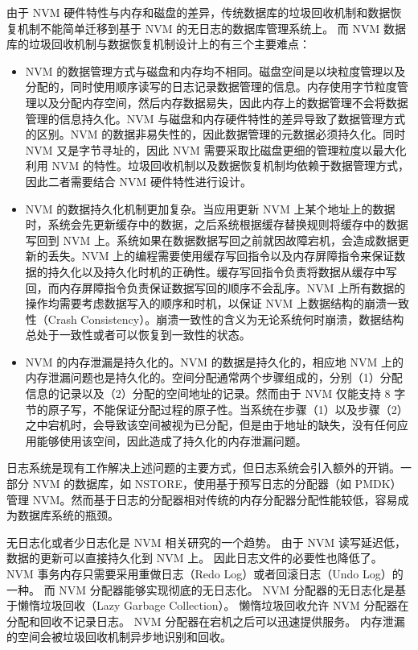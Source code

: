 由于 NVM 硬件特性与内存和磁盘的差异，传统数据库的垃圾回收机制和数据恢复机制不能简单迁移到基于 NVM 的无日志的数据库管理系统上。
而 NVM 数据库的垃圾回收机制与数据恢复机制设计上的有三个主要难点：
\begin{itemize}
    \item NVM 的数据管理方式与磁盘和内存均不相同。磁盘空间是以块粒度管理以及分配的，同时使用顺序读写的日志记录数据管理的信息。内存使用字节粒度管理以及分配内存空间，然后内存数据易失，因此内存上的数据管理不会将数据管理的信息持久化。NVM 与磁盘和内存硬件特性的差异导致了数据管理方式的区别。NVM 的数据非易失性的，因此数据管理的元数据必须持久化。同时 NVM 又是字节寻址的，因此 NVM 需要采取比磁盘更细的管理粒度以最大化利用 NVM 的特性。垃圾回收机制以及数据恢复机制均依赖于数据管理方式，因此二者需要结合 NVM 硬件特性进行设计。
    \item NVM 的数据持久化机制更加复杂。当应用更新 NVM 上某个地址上的数据时，系统会先更新缓存中的数据，之后系统根据缓存替换规则将缓存中的数据写回到 NVM 上。系统如果在数据数据写回之前就因故障宕机，会造成数据更新的丢失。NVM 上的编程需要使用缓存写回指令以及内存屏障指令来保证数据的持久化以及持久化时机的正确性。缓存写回指令负责将数据从缓存中写回，而内存屏障指令负责保证数据写回的顺序不会乱序。NVM 上所有数据的操作均需要考虑数据写入的顺序和时机，以保证 NVM 上数据结构的崩溃一致性（Crash Consistency）。崩溃一致性的含义为无论系统何时崩溃，数据结构总处于一致性或者可以恢复到一致性的状态。
    \item NVM 的内存泄漏是持久化的。NVM 的数据是持久化的，相应地 NVM 上的内存泄漏问题也是持久化的。空间分配通常两个步骤组成的，分别（1）分配信息的记录以及（2）分配的空间地址的记录。然而由于 NVM 仅能支持 8 字节的原子写，不能保证分配过程的原子性。当系统在步骤（1）以及步骤（2）之中宕机时，会导致该空间被视为已分配，但是由于地址的缺失，没有任何应用能够使用该空间，因此造成了持久化的内存泄漏问题。

\end{itemize}

日志系统是现有工作解决上述问题的主要方式，但日志系统会引入额外的开销。一部分 NVM 的数据库，如 NSTORE，使用基于预写日志的分配器（如 PMDK\cite{pmdk}）管理 NVM。然而基于日志的分配器相对传统的内存分配器分配性能较低，容易成为数据库系统的瓶颈。

无日志化或者少日志化是 NVM 相关研究的一个趋势。
由于 NVM 读写延迟低，数据的更新可以直接持久化到 NVM 上。
因此日志文件的必要性也降低了。
NVM 事务内存只需要采用重做日志（Redo Log）或者回滚日志（Undo Log）的一种。
而 NVM 分配器能够实现彻底的无日志化。
NVM 分配器的无日志化是基于懒惰垃圾回收（Lazy Garbage Collection）\cite{bhandari_makalu_2016}。
懒惰垃圾回收允许 NVM 分配器在分配和回收不记录日志。
NVM 分配器在宕机之后可以迅速提供服务。
内存泄漏的空间会被垃圾回收机制异步地识别和回收。

